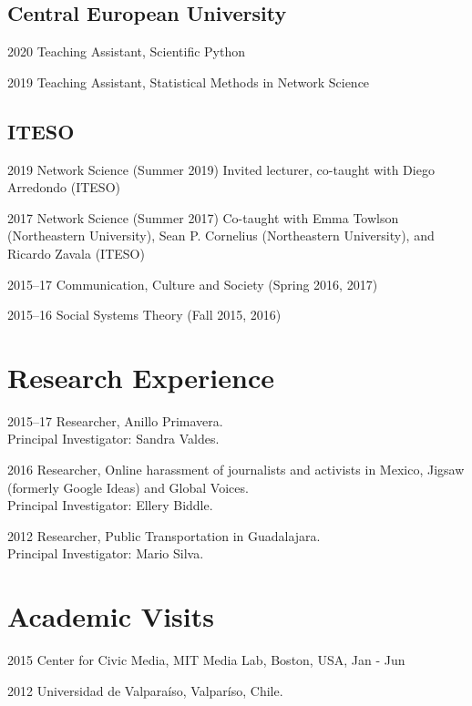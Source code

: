 \documentclass{academiccv}
\begin{document}
\subsection*{Central European University}
\begin{tablist}
	\item[2020] \tab Teaching Assistant, Scientific Python
	\item[2019] \tab Teaching Assistant, Statistical Methods in Network Science
\end{tablist}

\subsection*{ITESO}
\begin{tablist}
	\item[2019] \tab Network Science (Summer 2019) Invited lecturer, co-taught with Diego Arredondo (ITESO)
	\item[2017]	\tab Network Science (Summer 2017) Co-taught with Emma Towlson (Northeastern University), Sean P. Cornelius (Northeastern University), and Ricardo Zavala (ITESO)
	\item [2015--17]\tab Communication, Culture and Society (Spring 2016, 2017)
	\item [2015--16]\tab Social Systems Theory (Fall 2015, 2016)
\end{tablist} 

\section*{Research Experience}
\begin{tablist}
	\item[2015--17] 	\tab Researcher, Anillo Primavera. \\
									Principal Investigator: Sandra Valdes.
	\item[2016] 	\tab Researcher, Online harassment of journalists and activists in Mexico, Jigsaw (formerly Google Ideas) and Global Voices. \\
								Principal Investigator: Ellery Biddle.
	\item[2012] \tab Researcher, Public Transportation in Guadalajara. \\
							Principal Investigator: Mario Silva.
\end{tablist}

\section*{Academic Visits}
\begin{tablist}
	\item[2015] 	\tab Center for Civic Media, MIT Media Lab, Boston, USA, Jan - Jun
	\item[2012] 	\tab Universidad de Valparaíso, Valparíso, Chile.
\end{tablist}
\end{document}
